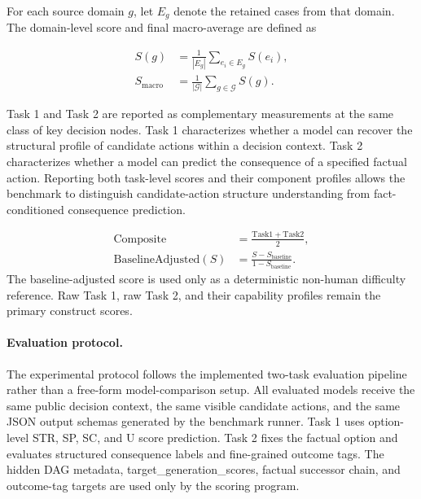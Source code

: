 \documentclass[pdflatex,sn-mathphys-num]{sn-jnl}%
\theoremstyle{thmstyleone}%
\theoremstyle{thmstyletwo}%
\theoremstyle{thmstylethree}%
\begin{document}
For each source domain $g$, let $E_g$ denote the retained cases from that domain. The domain-level score and final macro-average are defined as

\begin{align}
S(g)&=\frac{1}{|E_g|}\sum_{e_i\in E_g}S(e_i),\\
S_{\mathrm{macro}}&=\frac{1}{|\mathcal{G}|}\sum_{g\in\mathcal{G}}S(g).
\end{align}

Task 1 and Task 2 are reported as complementary measurements at the same class of key decision nodes. Task 1 characterizes whether a model can recover the structural profile of candidate actions within a decision context. Task 2 characterizes whether a model can predict the consequence of a specified factual action. Reporting both task-level scores and their component profiles allows the benchmark to distinguish candidate-action structure understanding from fact-conditioned consequence prediction.

\begin{align}
\mathrm{Composite}&=\frac{\mathrm{Task1}+\mathrm{Task2}}{2},\\
\mathrm{BaselineAdjusted}(S)&=\frac{S-S_{\mathrm{baseline}}}{1-S_{\mathrm{baseline}}}.
\end{align}
The baseline-adjusted score is used only as a deterministic non-human difficulty reference. Raw Task 1, raw Task 2, and their capability profiles remain the primary construct scores.

\paragraph{Evaluation protocol.}
The experimental protocol follows the implemented two-task evaluation pipeline rather than a free-form model-comparison setup. All evaluated models receive the same public decision context, the same visible candidate actions, and the same JSON output schemas generated by the benchmark runner. Task 1 uses option-level STR, SP, SC, and U score prediction. Task 2 fixes the factual option and evaluates structured consequence labels and fine-grained outcome tags. The hidden DAG metadata, target\_generation\_scores, factual successor chain, and outcome-tag targets are used only by the scoring program.
\end{document}
